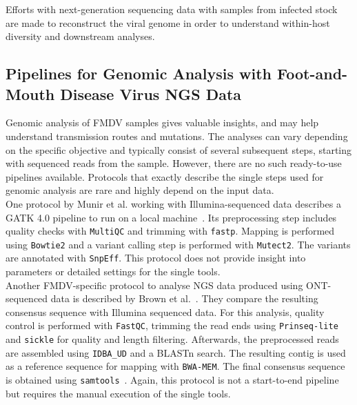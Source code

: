 Efforts with next-generation sequencing data with samples from infected stock are made to reconstruct the viral genome in order to understand within-host diversity and downstream analyses.

\subsection{Pipelines for Genomic Analysis with Foot-and-Mouth Disease Virus NGS Data}\label{sec:2-fmdv-pipelines}
Genomic analysis of \ac{FMDV} samples gives valuable insights, and may help understand transmission routes and mutations. The analyses can vary depending on the specific objective and typically consist of several subsequent steps, starting with sequenced reads from the sample. However, there are no such ready-to-use pipelines available. Protocols that exactly describe the single steps used for genomic analysis are rare and highly depend on the input data. \\
One protocol by Munir et al. working with Illumina-sequenced data describes a \ac{GATK} 4.0 pipeline to run on a local machine~\cite{munir2022whole}. Its preprocessing step includes quality checks with \texttt{MultiQC} and trimming with \texttt{fastp}. Mapping is performed using \texttt{Bowtie2} and a variant calling step is performed with \texttt{Mutect2}. The variants are annotated with \texttt{SnpEff}. This protocol does not provide insight into parameters or detailed settings for the single tools. \\
Another \ac{FMDV}-specific protocol to analyse \ac{NGS} data produced using \ac{ONT}-sequenced data is described by Brown et al.~\cite{brown2021characterising}. They compare the resulting consensus sequence with Illumina sequenced data. For this analysis, quality control is performed with \texttt{FastQC}, trimming the read ends using \texttt{Prinseq-lite} and \texttt{sickle} for quality and length filtering. Afterwards, the preprocessed reads are assembled using \texttt{IDBA\_UD} and a \ac{BLAST}n search. The resulting contig is used as a reference sequence for mapping with \texttt{BWA-MEM}. The final consensus sequence is obtained using \texttt{samtools}~\cite{brown2021characterising}. Again, this protocol is not a start-to-end pipeline but requires the manual execution of the single tools.
